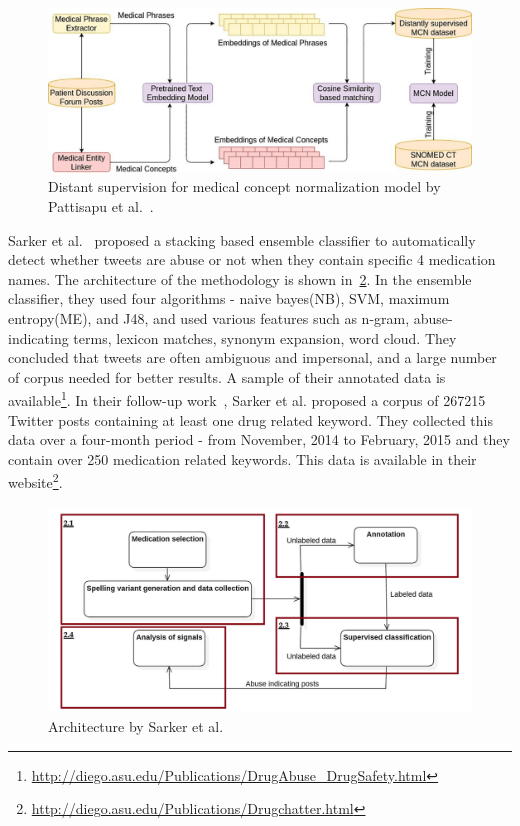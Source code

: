 \begin{figure}[h]
	\centering
	\includegraphics[width=0.99\linewidth]{Figures/o.jpg}
	\caption{Distant supervision for medical concept normalization model by Pattisapu et al.~\cite{PATTISAPU2020103522}.}
	\label{fig:medication-concept-normalization}
\end{figure}

Sarker et al.~\cite{sarker2016social} proposed a stacking based ensemble classifier to automatically detect whether tweets are abuse or not when they contain specific 4 medication names. The architecture of the methodology is shown in~\ref{fig:model-sarker}. In the ensemble classifier, they used four algorithms - naive bayes(NB), SVM, maximum entropy(ME), and J48, and used various features such as n-gram, abuse-indicating terms, lexicon matches, synonym expansion, word cloud. They concluded that tweets are often ambiguous and impersonal, and a large number of corpus needed for better results. A sample of their annotated data is available\footnote{\url{http://diego.asu.edu/Publications/DrugAbuse_DrugSafety.html}}. In  their  follow-up  work~\cite{sarker2017corpus}, Sarker et al. proposed a corpus  of  267215  Twitter  posts  containing  at least one drug related keyword. They collected this data  over a four-month  period - from  November, 2014  to  February, 2015 and they contain over 250 medication related keywords. This data is available in their website\footnote{\url{http://diego.asu.edu/Publications/Drugchatter.html}}.

\begin{figure}[h]
	\centering
	\includegraphics[width=0.99\linewidth]{Figures/h.png}
	\caption{Architecture by Sarker et al.~\cite{sarker2016social}}
	\label{fig:model-sarker}
\end{figure}

